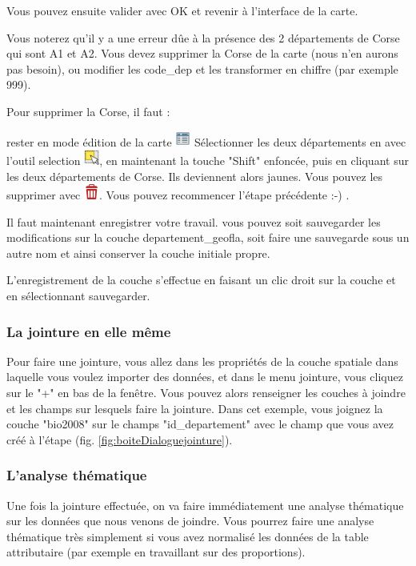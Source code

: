 \documentclass[a4paper, 11pt]{article}
\begin{document}
  Vous pouvez ensuite valider avec OK et revenir à l'interface de la carte.

  Vous noterez qu'il y a une erreur dûe à la présence des 2 départements de Corse qui sont A1 et A2. Vous devez supprimer la Corse de la carte (nous n'en aurons pas besoin), ou modifier les code\_dep et les transformer en chiffre (par exemple 999).

  Pour supprimer la Corse, il faut :

  rester en mode édition de la carte \includegraphics[width=0.5cm]{img/mActionOpenTable}  Sélectionner les deux départements en avec l’outil  selection \includegraphics[width=0.5cm]{img/mActionSelectRectangle}, en maintenant la touche "Shift" enfoncée, puis en cliquant sur les deux départements de Corse. Ils deviennent alors jaunes. Vous pouvez les supprimer avec \includegraphics[width=0.5cm]{img/mActionDeleteSelected}. Vous pouvez recommencer l'étape précédente :-) .

  Il faut maintenant enregistrer votre travail. vous pouvez soit sauvegarder les modifications sur la couche departement\_geofla, soit faire une sauvegarde sous un autre nom et ainsi conserver la couche initiale propre.

  L'enregistrement de la couche s'effectue en faisant un clic droit sur la couche et en sélectionnant sauvegarder.

  \subsubsection{La jointure en elle même}

  Pour faire une jointure, vous allez dans les propriétés de la couche spatiale dans laquelle vous voulez importer des données, et dans le menu jointure, vous cliquez sur le "+" en bas de la fenêtre. Vous pouvez alors renseigner les couches à joindre et les champs sur lesquels faire la jointure. Dans cet exemple, vous joignez la couche "bio2008" sur le champs "id\_departement" avec le champ que vous avez créé à l'étape (fig. \ref{fig:boiteDialoguejointure}).

  \subsubsection{L'analyse thématique}
  Une fois la jointure effectuée, on va faire immédiatement une analyse thématique sur les données que nous venons de joindre. Vous pourrez faire une analyse thématique très simplement si vous avez normalisé les données de la table attributaire (par exemple en travaillant sur des proportions).
\end{document}
